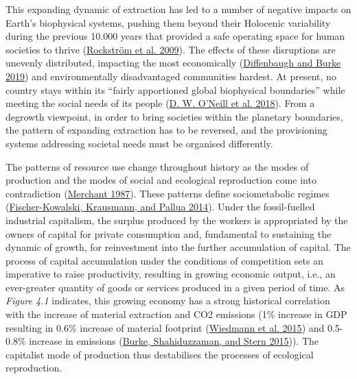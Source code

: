 \documentclass[a4paper, nobind]{templates/ociamthesis}
\begin{document}
This expanding dynamic of extraction has led to a number of negative impacts on Earth's biophysical systems, pushing them beyond their Holocenic variability during the previous 10.000 years that provided a safe operating space for human societies to thrive (\protect\hyperlink{ref-rockstrom_planetary_2009}{Rockström et al. 2009}). The effects of these disruptions are unevenly distributed, impacting the most economically (\protect\hyperlink{ref-diffenbaugh_global_2019}{Diffenbaugh and Burke 2019}) and environmentally disadvantaged communities hardest. At present, no country stays within its ``fairly apportioned global biophysical boundaries'' while meeting the social needs of its people (\protect\hyperlink{ref-oneill_good_2018}{D. W. O'Neill et al. 2018}). From a degrowth viewpoint, in order to bring societies within the planetary boundaries, the pattern of expanding extraction has to be reversed, and the provisioning systems addressing societal needs must be organised differently.

The patterns of resource use change throughout history as the modes of production and the modes of social and ecological reproduction come into contradiction (\protect\hyperlink{ref-merchant_theoretical_1987}{Merchant 1987}). These patterns define sociometabolic regimes (\protect\hyperlink{ref-fischer-kowalski_sociometabolic_2014}{Fischer-Kowalski, Krausmann, and Pallua 2014}). Under the fossil-fuelled industrial capitalism, the surplus produced by the workers is appropriated by the owners of capital for private consumption and, fundamental to sustaining the dynamic of growth, for reinvestment into the further accumulation of capital. The process of capital accumulation under the conditions of competition sets an imperative to raise productivity, resulting in growing economic output, i.e., an ever-greater quantity of goods or services produced in a given period of time. As \emph{Figure 4.1} indicates, this growing economy has a strong historical correlation with the increase of material extraction and CO2 emissions (1\% increase in GDP resulting in 0.6\% increase of material footprint (\protect\hyperlink{ref-wiedmann_material_2015}{Wiedmann et al. 2015}) and 0.5-0.8\% increase in emissions (\protect\hyperlink{ref-burke_carbon_2015}{Burke, Shahiduzzaman, and Stern 2015})). The capitalist mode of production thus destabilises the processes of ecological reproduction.
\end{document}
